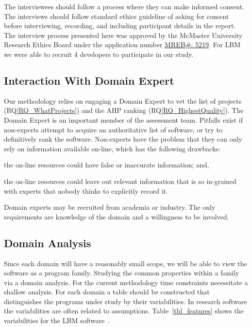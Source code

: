 \documentclass[runningheads]{llncs}
\newcommand{\rqref}[1]{RQ\ref{#1}}
\begin{document}
The interviewees should follow a process where they can make informed consent.
The interviews should follow standard ethics guideline of asking for consent
before interviewing, recording, and including participant details in the report.
The interview process presented here was approved by the McMaster University
Research Ethics Board under the application number 
\href{https://github.com/smiths/AIMSS/blob/master/StateOfPractice/MACREM/Application.pdf}
{MREB\#: 5219}.  For LBM we were able to recruit 4 developers to participate in
our study.

\subsection{Interaction With Domain Expert} \label{sec_vet_software_list}

Our methodology relies on engaging a Domain Expert to vet the list of projects
(\rqref{RQ_WhatProjects}) and the AHP ranking (\rqref{RQ_HighestQuality}).  The
Domain Expert is an important member of the assessment
team. Pitfalls exist if non-experts attempt to acquire an authoritative list of
software, or try to definitively rank the software. Non-experts have the problem
that they can only rely on information available on-line, which has the
following drawbacks:
\begin{inparaenum}[i)]
  \item the on-line resources could have false or inaccurate information; and,
  \item the on-line resources could leave out relevant information that is so
in-grained with experts that nobody thinks to explicitly record it.
\end{inparaenum}
Domain experts may be recruited from academia or industry.  The only
requirements are knowledge of the domain and a willingness to be involved.

\subsection{Domain Analysis} \label{SecDomainAnalysis}

Since each domain will have a reasonably small scope, we will be able to view
the software as a program family. Studying the common properties within a family
via a domain analysis.  For the current methodology time constraints necessitate
a shallow analysis. For each domain a table should be constructed that
distinguishes the programs under study by their variabilities.  In research
software the variabilities are often related to assumptions.
Table~\ref{tbl_features} shows the variabilities for the LBM
software~\cite{Michalski2021}.
\end{document}
